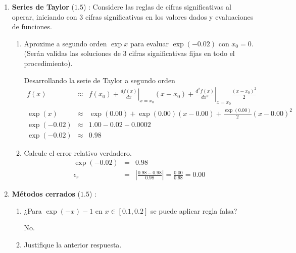 \documentclass[12pt]{article}
\begin{document}
  \begin{enumerate}[leftmargin=*,widest=9]
    \item \textbf{Series de Taylor} ($1.5$) : Considere las reglas de cifras significativas al operar, iniciando con 3 cifras significativas en los valores dados y evaluaciones de funciones.
    
    \begin{enumerate}[label=\alph*]
    \item Aproxime a segundo orden $\exp x$ para evaluar $\exp (-0.02)$ con $x_0 = 0$. (Serán validas las soluciones de 3 cifras significativas fijas en todo el procedimiento).
    
    Desarrollando la serie de Taylor a segundo orden
    \begin{eqnarray*}
    f(x) & \approx & f(x_0) + \left.\frac{df(x)}{dx}\right|_{x=x_0}(x-x_0)+ \left.\frac{d^2f(x)}{dx^2}\right|_{x=x_0}\frac{(x-x_0)^2}{2}\\
    \exp(x) & \approx & \exp(0.00) + \exp(0.00)(x-0.00) + \frac{\exp(0.00)}{2}(x-0.00)^2 \\
    \exp(-0.02) & \approx & 1.00 - 0.02 - 0.0002\\
    \exp(-0.02) & \approx & 0.98
    \end{eqnarray*}
    
   \item Calcule el error relativo verdadero.
    \begin{eqnarray*}
    \exp(-0.02) & = & 0.98\\
    \epsilon_r & = & \left| \frac{0.98 - 0.98}{0.98} \right| = \frac{0.00}{0.98} = 0.00  
    \end{eqnarray*}
    
    \end{enumerate}

    \item \textbf{Métodos cerrados} ($1.5$) :
    
    \begin{enumerate}[label=\alph*]
    \item ¿Para $\exp (-x) - 1$ en $x \in \left[ 0.1, 0.2 \right]$ se puede aplicar regla falsa?
    
    No.
    
    
    
    \item Justifique la anterior respuesta.
    

\end{enumerate}
\end{enumerate}
\end{document}
